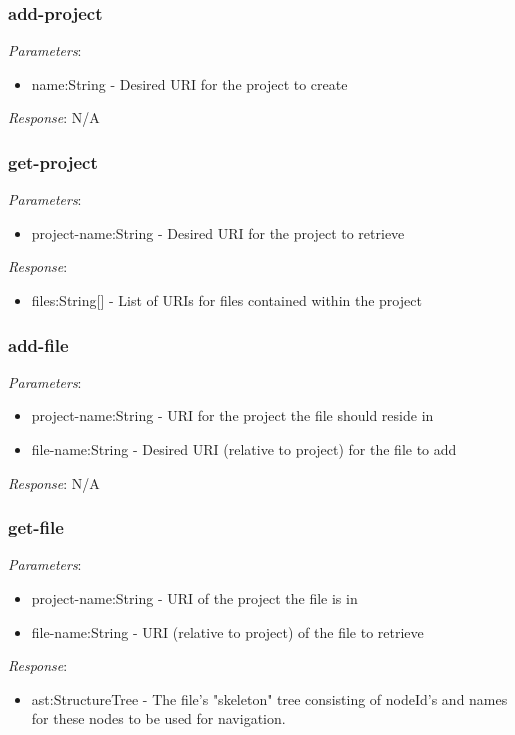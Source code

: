 \subsubsection{add-project}

\emph{Parameters}: 
\begin{itemize}
\item name:String - Desired URI for the project to create
\end{itemize}
\emph{Response}: N/A

\subsubsection{get-project}
\emph{Parameters}: 
\begin{itemize}
\item project-name:String - Desired URI for the project to retrieve
\end{itemize}
\emph{Response}: 
\begin{itemize}
\item files:String[] - List of URIs for files contained within the project 
\end{itemize}

\subsubsection{add-file}
\emph{Parameters}: 
\begin{itemize}
\item project-name:String - URI for the project the file should reside in
\item file-name:String - Desired URI (relative to project) for the file to add
\end{itemize}
\emph{Response}: N/A

\subsubsection{get-file}
\emph{Parameters}: 
\begin{itemize}
\item project-name:String - URI of the project the file is in
\item file-name:String - URI (relative to project) of the file to retrieve
\end{itemize}
\emph{Response}: 
\begin{itemize}
\item ast:StructureTree - The file's "skeleton" tree consisting of nodeId's and names for these nodes to be used for navigation.
\end{itemize}

